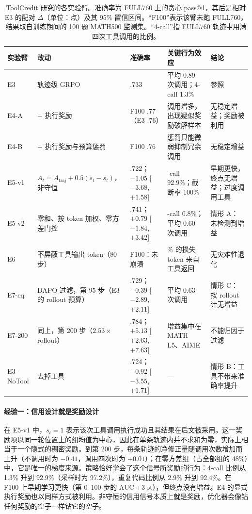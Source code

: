 \begin{table}[t]
\centering
\small
\caption{ToolCredit 研究的各实验臂。准确率为 FULL760 上的贪心 pass@1，其后是相对 E3 的配对 $\Delta$（单位：点）及其 95\% 置信区间。“F100”表示该臂未跑 FULL760，结果取自训练期间的 100 题 MATH500 监测集。“4-call”指 FULL760 轨迹中用满四次工具调用的比例。}
\label{tab:toolcredit}
\setlength{\tabcolsep}{3pt}
\renewcommand{\arraystretch}{1.1}
\begin{tabularx}{\linewidth}{@{}l>{\raggedright\arraybackslash}X>{\raggedright\arraybackslash}p{2.2cm}>{\raggedright\arraybackslash}X>{\raggedright\arraybackslash}X@{}}
\toprule
实验臂 & 改动 & 准确率 & 关键行为效应 & 结论 \\
\midrule
E3 & 轨迹级 GRPO & .733 & 平均 0.89 次调用；4-call 1.3\% & 参照 \\
E4-A & + 执行奖励 & F100 .77（E3 .76） & 调用增多，出现疑似奖励破解样本 & 无稳定增益；奖励被利用 \\
E4-B & + 执行奖励与预算惩罚 & F100 .76 & 惩罚只能微弱抑制冗余调用 & 无稳定增益 \\
E5-v1 & $A_t{=}A_{\text{traj}}{+}0.5(s_t{-}\bar s_t)$，非守恒 & .722；$-1.05$ [$-3.68$, $+1.58$] & 4-call 92.9\%；截断率 100\% & 早期更快，终点无增益；过度调用工具 \\
E5-v2 & 零和、按 token 加权、零方差门控 & .741；$+0.79$ [$-1.84$, $+3.42$] & 4-call 0.8\%；平均 0.60 次调用 & 情形 A：未检测到增益 \\
E6 & 不屏蔽工具输出 token（80 步） & F100：未崩溃 & 4.66\% 的损失 token 来自工具返回 & 无灾难性退化 \\
E7-eq & DAPO 过滤，第 95 步（E3 的 rollout 预算） & .729；$-0.39$ [$-2.89$, $+2.11$] & 平均 0.63 次调用 & 情形 C：按 rollout 计无增益 \\
E7-200 & 同上，第 200 步（$2.53\times$ rollout） & .784；$+5.13$ [$+2.63$, $+7.63$] & 增益集中在 MATH L5、AIME & 不能归因于过滤 \\
E3-NoTool & 去掉工具 & .724；$-0.92$ [$-3.55$, $+1.71$] & --- & 情形 B：工具不带来准确率提升 \\
\bottomrule
\end{tabularx}
\end{table}

\paragraph{经验一：信用设计就是奖励设计}
在 E5-v1 中，$s_t{=}1$ 表示该次工具调用执行成功且其结果在后文被采用。这一奖励项以同一轮位置上的组均值为中心，因此在单条轨迹内并不求和为零，实际上相当于一个隐式的稠密奖励。到第 200 步，每条轨迹的净修正量随调用次数增加而上升（不调用时为 $-0.41$，调用四次时为 $+0.01$）；在零方差组（占全部组的 48\%）中，它是唯一的梯度来源。策略恰好学会了这个信号所奖励的行为：4-call 比例从 1.3\% 升到 92.9\%（采样时为 97.2\%），重复代码比例从 2.9\% 升到 92.4\%。在 F100 上早期学习更快（第 0--100 步的 AUC +3\,pt），但终点没有增益。E4 的显式执行奖励也以同样方式被利用。非守恒的信用信号本质上就是奖励，优化器会像钻任何奖励的空子一样钻它的空子。

